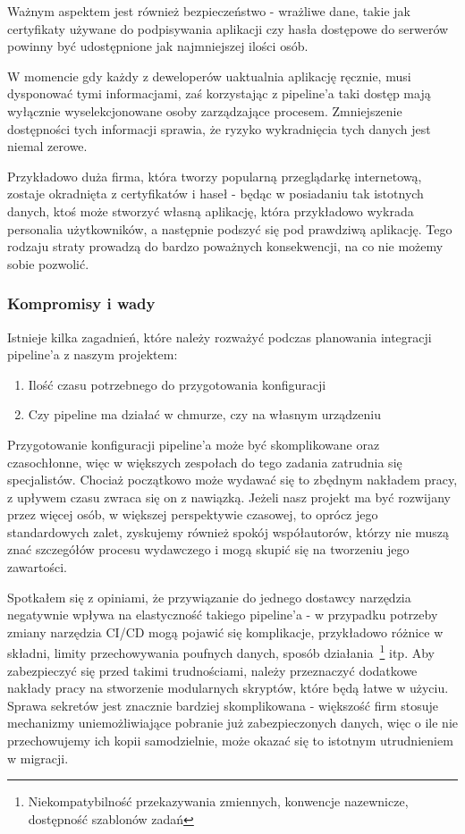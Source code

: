 Ważnym aspektem jest również bezpieczeństwo - wrażliwe dane, takie jak certyfikaty używane do podpisywania aplikacji czy
hasła dostępowe do serwerów powinny być udostępnione jak najmniejszej ilości osób.

W momencie gdy każdy z deweloperów uaktualnia aplikację ręcznie, musi dysponować tymi informacjami,
zaś korzystając z pipeline'a taki dostęp mają wyłącznie wyselekcjonowane osoby zarządzające procesem.
Zmniejszenie dostępności tych informacji sprawia, że ryzyko wykradnięcia tych danych jest niemal zerowe.

Przykładowo duża firma, która tworzy popularną przeglądarkę internetową, zostaje okradnięta z certyfikatów i haseł - 
będąc w posiadaniu tak istotnych danych, ktoś może stworzyć własną aplikację, która przykładowo wykrada personalia użytkowników, 
a następnie podszyć się pod prawdziwą aplikację. 
Tego rodzaju straty prowadzą do bardzo poważnych konsekwencji, na co nie możemy sobie pozwolić.

\subsubsection{Kompromisy i wady}
Istnieje kilka zagadnień, które należy rozważyć podczas planowania integracji pipeline'a z naszym projektem:
\begin{enumerate}
    \item Ilość czasu potrzebnego do przygotowania konfiguracji
    \item Czy pipeline ma działać w chmurze, czy na własnym urządzeniu
\end{enumerate}
Przygotowanie konfiguracji pipeline'a może być skomplikowane oraz czasochłonne, 
więc w większych zespołach do tego zadania zatrudnia się specjalistów. 
Chociaż początkowo może wydawać się to zbędnym nakładem pracy, z upływem czasu zwraca się on z nawiązką.
Jeżeli nasz projekt ma być rozwijany przez więcej osób, w większej perspektywie czasowej, 
to oprócz jego standardowych zalet, zyskujemy również spokój współautorów, 
którzy nie muszą znać szczegółów procesu wydawczego i mogą skupić się na tworzeniu jego zawartości.

Spotkałem się z opiniami, że przywiązanie do jednego dostawcy narzędzia negatywnie wpływa na elastyczność 
takiego pipeline'a - w przypadku potrzeby zmiany narzędzia CI/CD mogą pojawić się komplikacje, 
przykładowo różnice w składni, limity przechowywania poufnych danych, sposób działania~\footnote{
    Niekompatybilność przekazywania zmiennych, konwencje nazewnicze, dostępność szablonów zadań
} itp.
Aby zabezpieczyć się przed takimi trudnościami, należy przeznaczyć dodatkowe nakłady pracy na stworzenie 
modularnych skryptów, które będą łatwe w użyciu.
Sprawa sekretów jest znacznie bardziej skomplikowana - większość firm stosuje mechanizmy uniemożliwiające pobranie już 
zabezpieczonych danych, więc o ile nie przechowujemy ich kopii samodzielnie, może okazać się to istotnym utrudnieniem w migracji.

